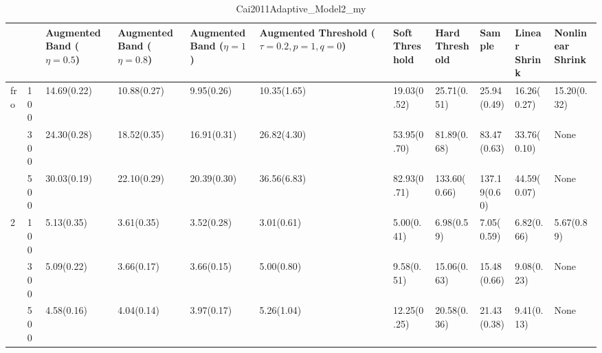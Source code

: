 \begin{table}[htbp]
\centering
\caption{Cai2011Adaptive_Model2_my}
\label{my label}
\begin{tabular}{ll|p{2cm}p{2cm}p{2cm}p{2cm}p{2cm}p{2cm}p{2cm}p{2cm}p{2cm}}
\toprule
  &     & Augmented Band ($\eta=0.5$) & Augmented Band ($\eta=0.8$) & Augmented Band ($\eta=1$) & Augmented Threshold ($\tau=0.2, p=1, q=0$) & Soft Threshold & Hard Threshold &        Sample & Linear Shrink & Nonlinear Shrink \\
\midrule
fro & 100 &                 14.69(0.22) &                 10.88(0.27) &                9.95(0.26) &                                10.35(1.65) &    19.03(0.52) &    25.71(0.51) &   25.94(0.49) &   16.26(0.27) &      15.20(0.32) \\
  & 300 &                 24.30(0.28) &                 18.52(0.35) &               16.91(0.31) &                                26.82(4.30) &    53.95(0.70) &    81.89(0.68) &   83.47(0.63) &   33.76(0.10) &             None \\
  & 500 &                 30.03(0.19) &                 22.10(0.29) &               20.39(0.30) &                                36.56(6.83) &    82.93(0.71) &   133.60(0.66) &  137.19(0.60) &   44.59(0.07) &             None \\
2 & 100 &                  5.13(0.35) &                  3.61(0.35) &                3.52(0.28) &                                 3.01(0.61) &     5.00(0.41) &     6.98(0.59) &    7.05(0.59) &    6.82(0.66) &       5.67(0.89) \\
  & 300 &                  5.09(0.22) &                  3.66(0.17) &                3.66(0.15) &                                 5.00(0.80) &     9.58(0.51) &    15.06(0.63) &   15.48(0.66) &    9.08(0.23) &             None \\
  & 500 &                  4.58(0.16) &                  4.04(0.14) &                3.97(0.17) &                                 5.26(1.04) &    12.25(0.25) &    20.58(0.36) &   21.43(0.38) &    9.41(0.13) &             None \\
\bottomrule
\end{tabular}
\end{table}
